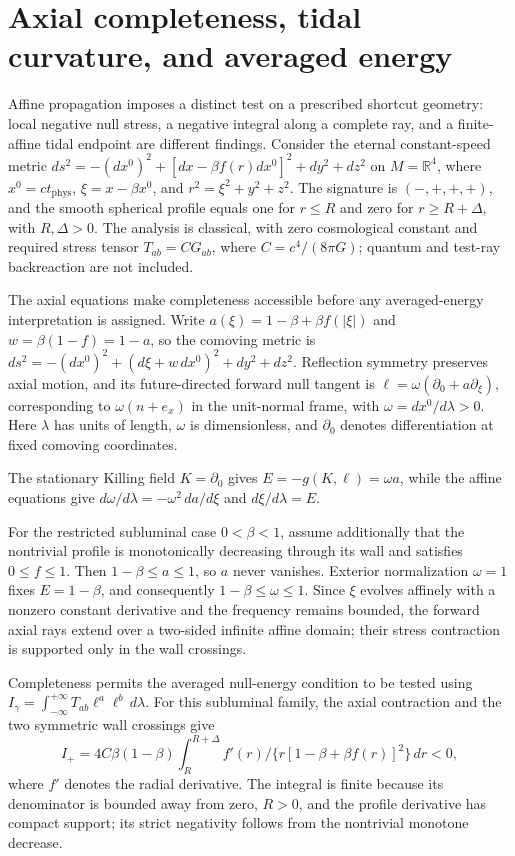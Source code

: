 \documentclass[11pt]{article}
\begin{document}
\section{Axial completeness, tidal curvature, and averaged energy}
Affine propagation imposes a distinct test on a prescribed shortcut geometry: local negative null stress, a negative integral along a complete ray, and a finite-affine tidal endpoint are different findings. Consider the eternal constant-speed metric $ds^2=-(dx^0)^2+[dx-\beta f(r)dx^0]^2+dy^2+dz^2$ on $M=\mathbb{R}^4$, where $x^0=ct_{\mathrm{phys}}$, $\xi=x-\beta x^0$, and $r^2=\xi^2+y^2+z^2$. The signature is $(-,+,+,+)$, and the smooth spherical profile equals one for $r\leq R$ and zero for $r\geq R+\Delta$, with $R,\Delta>0$. The analysis is classical, with zero cosmological constant and required stress tensor $T_{ab}=C G_{ab}$, where $C=c^4/(8\pi G)$; quantum and test-ray backreaction are not included.

The axial equations make completeness accessible before any averaged-energy interpretation is assigned. Write $a(\xi)=1-\beta+\beta f(|\xi|)$ and $w=\beta(1-f)=1-a$, so the comoving metric is $ds^2=-(dx^0)^2+(d\xi+w\,dx^0)^2+dy^2+dz^2$. Reflection symmetry preserves axial motion, and its future-directed forward null tangent is $\ell=\omega(\partial_0+a\partial_\xi)$, corresponding to $\omega(n+e_x)$ in the unit-normal frame, with $\omega=dx^0/d\lambda>0$. Here $\lambda$ has units of length, $\omega$ is dimensionless, and $\partial_0$ denotes differentiation at fixed comoving coordinates.

The stationary Killing field $K=\partial_0$ gives $E=-g(K,\ell)=\omega a$, while the affine equations give $d\omega/d\lambda=-\omega^2\,da/d\xi$ and $d\xi/d\lambda=E$.

For the restricted subluminal case $0<\beta<1$, assume additionally that the nontrivial profile is monotonically decreasing through its wall and satisfies $0\leq f\leq1$. Then $1-\beta\leq a\leq1$, so $a$ never vanishes. Exterior normalization $\omega=1$ fixes $E=1-\beta$, and consequently $1-\beta\leq\omega\leq1$. Since $\xi$ evolves affinely with a nonzero constant derivative and the frequency remains bounded, the forward axial rays extend over a two-sided infinite affine domain; their stress contraction is supported only in the wall crossings.

Completeness permits the averaged null-energy condition to be tested using $I_\gamma=\int_{-\infty}^{+\infty}T_{ab}\ell^a\ell^b\,d\lambda$. For this subluminal family, the axial contraction and the two symmetric wall crossings give \[I_+=4C\beta(1-\beta)\int_R^{R+\Delta}f'(r)\big/\{r[1-\beta+\beta f(r)]^2\}\,dr<0,\] where $f'$ denotes the radial derivative. The integral is finite because its denominator is bounded away from zero, $R>0$, and the profile derivative has compact support; its strict negativity follows from the nontrivial monotone decrease.
\end{document}
